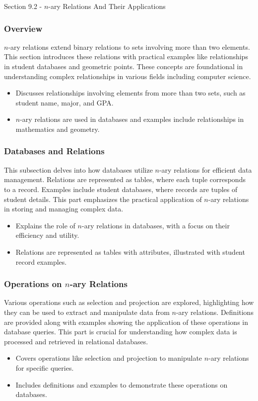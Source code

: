 \begin{notes}{Section 9.2 - $n$-ary Relations And Their Applications}
    \subsubsection*{Overview}
    $n$-ary relations extend binary relations to sets involving more than two elements. This section introduces these relations with practical examples like relationships in student databases and 
    geometric points. These concepts are foundational in understanding complex relationships in various fields including computer science.
    \begin{itemize}
        \item Discusses relationships involving elements from more than two sets, such as student name, major, and GPA.
        \item $n$-ary relations are used in databases and examples include relationships in mathematics and geometry.
    \end{itemize}
    
    \subsubsection*{Databases and Relations}
    This subsection delves into how databases utilize $n$-ary relations for efficient data management. Relations are represented as tables, where each tuple corresponds to a record. Examples include 
    student databases, where records are tuples of student details. This part emphasizes the practical application of $n$-ary relations in storing and managing complex data.
    \begin{itemize}
        \item Explains the role of $n$-ary relations in databases, with a focus on their efficiency and utility.
        \item Relations are represented as tables with attributes, illustrated with student record examples.
    \end{itemize}
    
    \subsubsection*{Operations on $n$-ary Relations}
    Various operations such as selection and projection are explored, highlighting how they can be used to extract and manipulate data from $n$-ary relations. Definitions are provided along with examples 
    showing the application of these operations in database queries. This part is crucial for understanding how complex data is processed and retrieved in relational databases.
    \begin{itemize}
        \item Covers operations like selection and projection to manipulate $n$-ary relations for specific queries.
        \item Includes definitions and examples to demonstrate these operations on databases.
    \end{itemize}
    

\end{notes}
